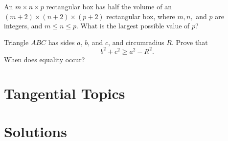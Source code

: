 \documentclass[blue,onecol]{shooting}
\begin{document}
\begin{prob}[AIME 1998/14]{9}
An $m\times n\times p$ rectangular box has half the volume of an $(m + 2)\times(n + 2)\times(p + 2)$ rectangular box, where $m, n,$ and $p$ are integers, and $m\le n\le p.$ What is the largest possible value of $p$?
\end{prob} 

\begin{prob}[]{13}
Triangle $ABC$ has sides $a$, $b$, and $c$, and circumradius $R$. Prove that
\[b^2 + c^2 \ge a^2 - R^2.\]
When does equality occur?
\end{prob}


\part{Tangential Topics}

\part{Solutions}

\setcounter{chapter}{0}
\end{document}
